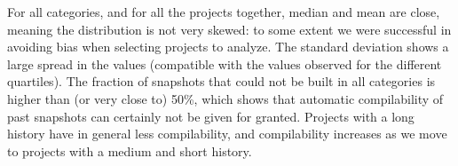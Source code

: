 
\begin{table*}[h]

  \caption{Reproduction study - Errors by build system.}
  \label{table:results-reproduction-build-systems-errors}

\begin{center}
\end{center}

\end{table*}

For all categories, and for all the projects together, median and mean are close, meaning the distribution is not very skewed: to some extent we were successful in avoiding bias when selecting projects to analyze.  
The standard deviation shows a large spread in the values (compatible with the values observed for the different quartiles). 
The fraction of snapshots that could not be built in all categories is higher than (or very close to) 50\%, which shows that automatic compilability of past snapshots can certainly not be given for granted. 
Projects with a long history have in general less compilability, and compilability increases as we move to projects with a medium and short history.

